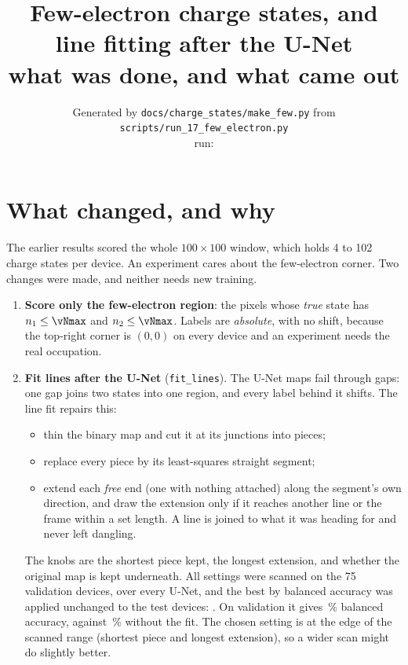 \documentclass[10pt,a4paper]{article}
\title{Few-electron charge states, and line fitting after the U-Net\\[2pt]
\large what was done, and what came out}
\author{\small Generated by \texttt{docs/charge\_states/make\_few.py} from
\texttt{scripts/run\_17\_few\_electron.py}\\
\small run: \texttt{\vRun}}
\date{}
\begin{document}
\maketitle

\section{What changed, and why}

The earlier results scored the whole $100\times100$ window, which holds 4 to
102 charge states per device.  An experiment cares about the few-electron
corner.  Two changes were made, and neither needs new training.

\begin{enumerate}
\item \textbf{Score only the few-electron region}: the pixels whose
  \emph{true} state has $n_1\le\vNmax$ and $n_2\le\vNmax$.  Labels are
  \emph{absolute}, with no shift, because the top-right corner is $(0,0)$ on
  every device and an experiment needs the real occupation.
\item \textbf{Fit lines after the U-Net} (\texttt{fit\_lines}).  The U-Net
  maps fail through gaps: one gap joins two states into one region, and every
  label behind it shifts.  The line fit repairs this:
  \begin{itemize}
  \item thin the binary map and cut it at its junctions into pieces;
  \item replace every piece by its least-squares straight segment;
  \item extend each \emph{free} end (one with nothing attached) along the
    segment's own direction, and draw the extension only if it reaches
    another line or the frame within a set length.  A line is joined to what
    it was heading for and never left dangling.
  \end{itemize}
  The knobs are the shortest piece kept, the longest extension, and whether
  the original map is kept underneath.  All \vNFit{} settings were scanned on
  the 75 validation devices, over every U-Net, and the best by balanced
  accuracy was applied unchanged to the test devices: \emph{\vFitKnob}.  On
  validation it gives \vFitVal\,\% balanced accuracy, against \vPlainVal\,\%
  without the fit.  The chosen setting is at the edge of the scanned range
  (shortest piece and longest extension), so a wider scan might do slightly
  better.
\end{enumerate}
\end{document}
